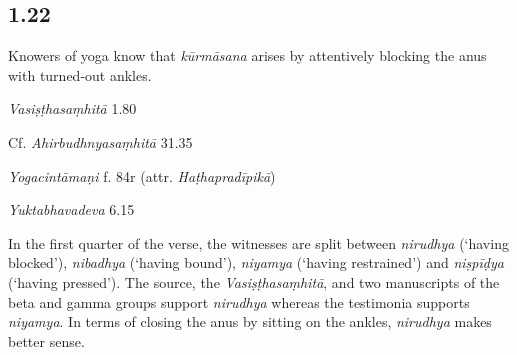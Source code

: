 \begin{ekdosis}
\subsection*{1.22}
\begin{translation}[hp01_022]
Knowers of yoga know that \emph{kūrmāsana} arises by attentively blocking the anus with turned-out ankles.
\end{translation}

\begin{sources}[hp01_022]
\emph{Vasiṣṭhasaṃhitā} 1.80

\begin{versinnote}
\end{versinnote}

Cf. \emph{Ahirbudhnyasaṃhitā} 31.35

\begin{versinnote}
\end{versinnote}

\end{sources}

\begin{testimonia}[hp01_022]
\emph{Yogacintāmaṇi} f. 84r (attr. \emph{Haṭhapradīpikā})

\begin{versinnote}
\end{versinnote}

\emph{Yuktabhavadeva} 6.15

\begin{versinnote}
\end{versinnote}

\end{testimonia}

\begin{philcomm}[hp01_022]   
In the first quarter of the verse, the witnesses are split between \emph{nirudhya} (‘having blocked’), \emph{nibadhya} (‘having bound’), \emph{niyamya} (‘having restrained’) and \emph{niṣpīḍya} (‘having pressed’). The source, the \emph{Vasiṣṭhasaṃhitā}, and two manuscripts of the beta and gamma groups support \emph{nirudhya} whereas the testimonia supports \emph{niyamya}. In terms of closing the anus by sitting on the ankles, \emph{nirudhya} makes better sense. 


\end{philcomm}
\end{ekdosis}
